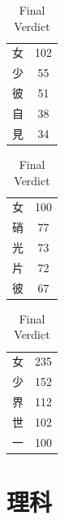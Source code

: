 \documentclass[uplatex,dvipdfmx,paper=a4paper,fontsize=11pt,jafontscale=0.9247,lang=ja]{jlreq}
\begin{document}
\begin{table}[htbp]
  \centering
  \begin{minipage}{0.32\linewidth}
      \centering
      \caption{Adverse Prelude}
      \begin{tabular}{|c c|} \hline
      女 & 102 \\
      少 & 55 \\
      彼 & 51 \\
      自 & 38 \\
      見 & 34 \\ \hline
      \end{tabular}
  \end{minipage}
  \hfill
  \begin{minipage}{0.32\linewidth}
      \centering
      \caption{Black Fate}
      \begin{tabular}{|c c|} \hline
      女 & 100 \\
      硝 & 77 \\
      光 & 73 \\
      片 & 72 \\
      彼 & 67 \\ \hline
  \end{tabular}
  \end{minipage}
  \hfill
  \begin{minipage}{0.32\linewidth}
    \centering
    \caption{Final Verdict}
    \begin{tabular}{|c c|} \hline
    女 & 235 \\
    少 & 152 \\
    界 & 112 \\
    世 & 102 \\
    一 & 100 \\ \hline
    \end{tabular}
  \end{minipage}
\end{table}

\newpage
\section*{理科}
\end{document}
